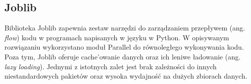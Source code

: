 \subsection{Joblib}
Biblioteka Joblib zapewnia zestaw narzędzi do zarządzaniem przepływem (ang. \textit{flow}) kodu w programach napisanych w języku w Python.
W opisywanym rozwiązaniu wykorzystano moduł Parallel do równoległego wykonywania kodu.
Poza tym, Joblib oferuje cache'owanie danych oraz ich leniwe ładowanie (ang. \textit{lazy loading}).
Jednymi z istotnych zalet jest brak zależności do innych niestandardowych pakietów oraz wysoka wydajność na dużych zbiorach danych.
